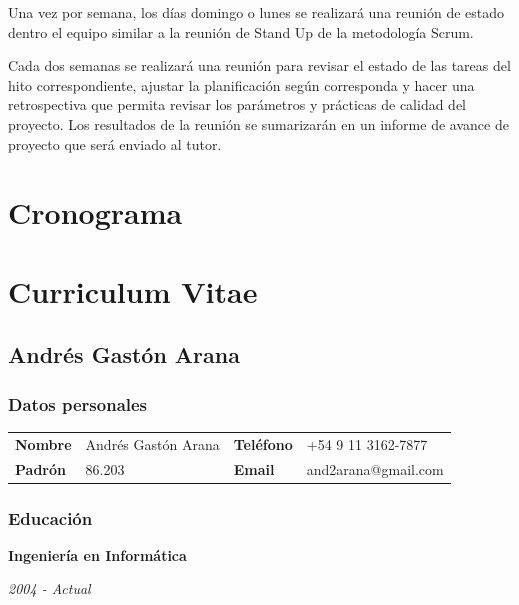 \documentclass[a4paper,11pt]{article}
\begin{document}
Una vez por semana, los días domingo o lunes se realizará una reunión de estado
dentro el equipo similar a la reunión de Stand Up de la metodología Scrum.

Cada dos semanas se realizará una reunión para revisar el estado de las tareas
del hito correspondiente, ajustar la planificación según corresponda y hacer
una retrospectiva que permita revisar los parámetros y prácticas de calidad del
proyecto. Los resultados de la reunión se sumarizarán en un informe de avance
de proyecto que será enviado al tutor.

\section{Cronograma}

\section{Curriculum Vitae}

\subsection{Andrés Gastón Arana}

\subsubsection{Datos personales}

\noindent \begin{tabular}{l l l l}
  \textbf{Nombre} & Andrés Gastón Arana & \textbf{Teléfono} & +54 9 11 3162-7877\\
  \textbf{Padrón} & 86.203              & \textbf{Email}    & and2arana@gmail.com \\
\end{tabular}

\subsubsection{Educación}

\noindent \textbf{Ingeniería en Informática}

\noindent\emph{2004 - Actual}
\end{document}
